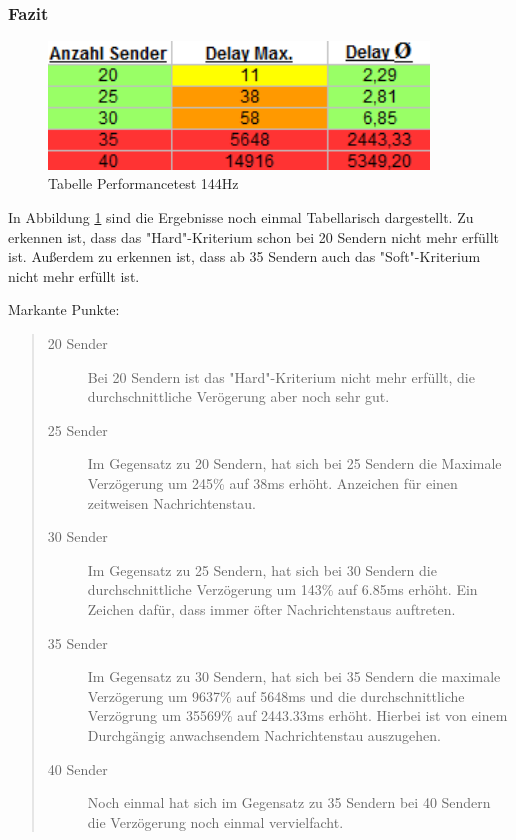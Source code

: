 \subsubsection{Fazit}
\begin{figure}[htH]
\centering
\includegraphics[width=0.9\textwidth]{backend/Tabelle_Performance_144hz.PNG}
\caption{Tabelle Performancetest 144Hz}
\label{backfig19}
\end{figure}
In Abbildung \ref{backfig19} sind die Ergebnisse noch einmal Tabellarisch dargestellt.
Zu erkennen ist, dass das "Hard"-Kriterium schon bei 20 Sendern nicht mehr erfüllt ist.
Außerdem zu erkennen ist, dass ab 35 Sendern auch das "Soft"-Kriterium nicht mehr erfüllt ist.

Markante Punkte:

\begin{quote}
  \begin{description}
  \item[20 Sender]
  Bei 20 Sendern ist das "Hard"-Kriterium nicht mehr erfüllt, die durchschnittliche Verögerung aber noch sehr gut.

  \item[25 Sender]
  Im Gegensatz zu 20 Sendern, hat sich bei 25 Sendern die Maximale Verzögerung um 245\% auf 38ms erhöht. Anzeichen für einen zeitweisen Nachrichtenstau.

  \item[30 Sender]
  Im Gegensatz zu 25 Sendern, hat sich bei 30 Sendern die durchschnittliche Verzögerung um 143\% auf 6.85ms erhöht. Ein Zeichen dafür, dass immer öfter Nachrichtenstaus auftreten.

  \item[35 Sender]
  Im Gegensatz zu 30 Sendern, hat sich bei 35 Sendern die maximale Verzögerung um 9637\% auf 5648ms und die durchschnittliche Verzögrung um 35569\% auf 2443.33ms erhöht. Hierbei ist von einem Durchgängig anwachsendem Nachrichtenstau auszugehen.

  \item[40 Sender]
  Noch einmal hat sich im Gegensatz zu 35 Sendern bei 40 Sendern die Verzögerung noch einmal vervielfacht.
  \end{description}
\end{quote}

